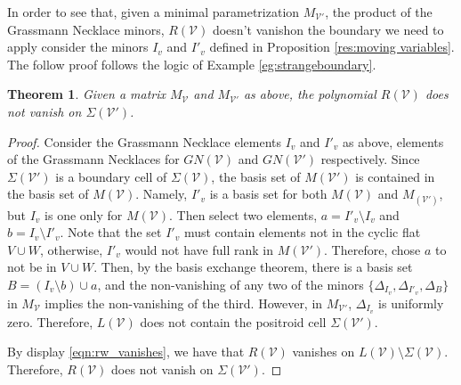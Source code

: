 \documentclass[11pt]{article}
\newcommand{\cV}{\mathcal{V}}
\newtheorem{thm}{Theorem}[section]
\theoremstyle{remark}
\theoremstyle{definition}
\begin{document}
In order to see that, given a minimal parametrization $M_{\cV'}$, the product of the Grassmann Necklace minors, $R(\cV)$ doesn't vanishon the boundary we need to apply consider the minors $I_v$ and $I'_v$ defined in Proposition \ref{res:moving variables}. The follow proof follows the logic of  Example \ref{eg:strangeboundary}.

\begin{thm}
Given a matrix $M_{\cV}$ and $M_{\cV'}$ as above, the polynomial $R(\cV)$ does not vanish on $\Sigma(\cV')$. 
\end{thm} 

\begin{proof}
Consider the Grassmann Necklace elements $I_v$ and $I'_v$ as above, elements of the Grassmann Necklaces for $GN(\cV)$ and $GN(\cV')$ respectively. Since $\Sigma(\cV')$ is a boundary cell of $\Sigma(\cV)$, the basis set of $M(\cV')$ is contained in the basis set of $M(\cV)$. Namely, $I'_v$ is a basis set for both $M(\cV)$ and $M_(\cV')$, but $I_v$ is one only for $M(\cV)$. Then select two elements, $a = I'_v \setminus I_v$ and $b = I_v \setminus I'_v$. Note that the set $I'_v$ must contain elements not in the cyclic flat $V \cup W$, otherwise, $I'_v$ would not have full rank in $M(\cV')$. Therefore, chose $a$ to not be in $V \cup W$. Then, by the basis exchange theorem, there is a basis set $B = (I_v \setminus b)\cup a$, and the non-vanishing of any two of the minors $\{\Delta_{I_v}, \Delta_{I'_v}, \Delta_{B}\}$ in $M_\cV$ implies the non-vanishing of the third. However, in $M_{\cV'}$, $\Delta_{I_v}$ is uniformly zero. Therefore, $L(\cV)$ does not contain the positroid cell $\Sigma(\cV')$.

By display \eqref{eqn:rw_vanishes}, we have that $R(\cV)$ vanishes on $L(\cV) \setminus \Sigma(\cV)$. Therefore, $R(\cV)$ does not vanish on $\Sigma(\cV')$. 
\end{proof}
\end{document}
